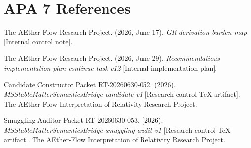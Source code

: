 \documentclass[11pt]{article}
\begin{document}
\section{APA 7 References}

The AEther-Flow Research Project. (2026, June 17). \emph{GR derivation burden
map} [Internal control note].

The AEther-Flow Research Project. (2026, June 29). \emph{Recommendations
implementation plan continue task v12} [Internal implementation plan].

Candidate Constructor Packet RT-20260630-052. (2026).
\emph{MSStableMatterSemanticsBridge candidate v1} [Research-control TeX
artifact]. The AEther-Flow Interpretation of Relativity Research Project.

Smuggling Auditor Packet RT-20260630-053. (2026).
\emph{MSStableMatterSemanticsBridge smuggling audit v1} [Research-control TeX
artifact]. The AEther-Flow Interpretation of Relativity Research Project.
\end{document}

